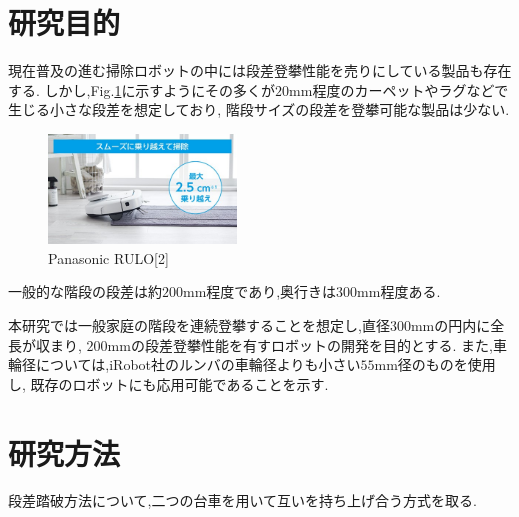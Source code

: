 \documentclass[dvipdfmx]{jsarticle}
\begin{document}
\section{研究目的}
現在普及の進む掃除ロボットの中には段差登攀性能を売りにしている製品も存在する.
しかし,Fig.\ref{fig:rulo}に示すようにその多くが$20\mathrm{mm}$程度のカーペットやラグなどで生じる小さな段差を想定しており,
階段サイズの段差を登攀可能な製品は少ない.
\begin{figure}[H]
  \centering
  \includegraphics[width=50mm]{image/rulo.jpg}
  \caption{Panasonic RULO[2]}
\label{fig:rulo}
\end{figure}

一般的な階段の段差は約$200\mathrm{mm}$程度であり,奥行きは$300\mathrm{mm}$程度ある.

本研究では一般家庭の階段を連続登攀することを想定し,直径$300\mathrm{mm}$の円内に全長が収まり,
$200\mathrm{mm}$の段差登攀性能を有すロボットの開発を目的とする.
また,車輪径については,iRobot社のルンバの車輪径よりも小さい$55\mathrm{mm}$径のものを使用し,
既存のロボットにも応用可能であることを示す.

\section{研究方法}
段差踏破方法について,二つの台車を用いて互いを持ち上げ合う方式を取る.
\end{document}
